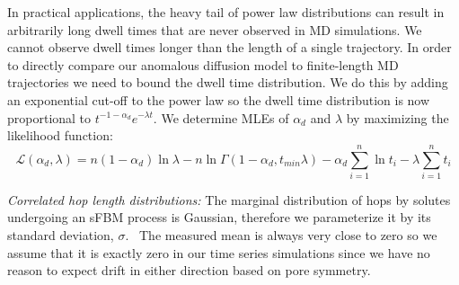 \documentclass{article}
\begin{document}
  In practical applications, the heavy tail of power law distributions can result in 
  arbitrarily long dwell times that are never observed in MD simulations. We cannot
  observe dwell times longer than the length of a single trajectory. 
  In order to directly compare our anomalous diffusion model to finite-length MD 
  trajectories we need to bound the dwell time distribution. We do this by adding 
  an exponential cut-off to the power law so the dwell time distribution is 
  now proportional to $t^{-1 - \alpha_d}e^{-\lambda t}$.
  We determine MLEs of $\alpha_d$ and $\lambda$ by maximizing the likelihood function:~\cite{clauset_power-law_2009}
  \begin{equation}
    \mathcal{L}(\alpha_d, \lambda) = n(1 - \alpha_d)\ln\lambda - n\ln\Gamma(1 - \alpha_d, t_{min}\lambda) - \alpha_d\sum_{i=1}^{n}\ln t_i - \lambda\sum_{i=1}^n t_i
  \label{eqn:powerlaw_cutoff_likelihood}
  \end{equation}
  
  \textit{Correlated hop length distributions:} The marginal distribution of hops by solutes 
  undergoing an sFBM process is Gaussian, therefore we parameterize it by its standard deviation, 
  $\sigma$.~\cite{metzler_random_2000, metzler_anomalous_2014,neusius_subdiffusion_2009}
  The measured mean is always very close to zero so we assume that it is exactly zero
  in our time series simulations since we have no reason to expect drift in either direction
  based on pore symmetry.
\end{document}
